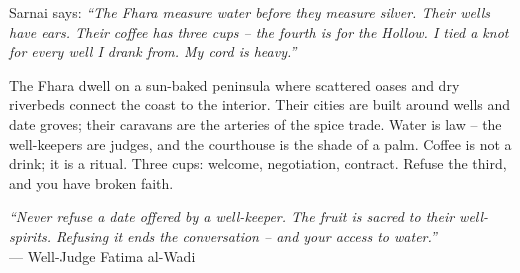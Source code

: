 \documentclass[12pt,oneside]{book}
\begin{document}
\noindent
Sarnai says: \textit{``The Fhara measure water before they measure silver. Their wells have ears. Their coffee has three cups -- the fourth is for the Hollow. I tied a knot for every well I drank from. My cord is heavy.''}

\noindent
The Fhara dwell on a sun-baked peninsula where scattered oases and dry riverbeds connect the coast to the interior. Their cities are built around wells and date groves; their caravans are the arteries of the spice trade. Water is law -- the well-keepers are judges, and the courthouse is the shade of a palm. Coffee is not a drink; it is a ritual. Three cups: welcome, negotiation, contract. Refuse the third, and you have broken faith.

\vspace{0.5em}
\noindent\textit{``Never refuse a date offered by a well-keeper. The fruit is sacred to their well-spirits. Refusing it ends the conversation -- and your access to water.''} \\
--- Well-Judge Fatima al-Wadi
\end{document}
